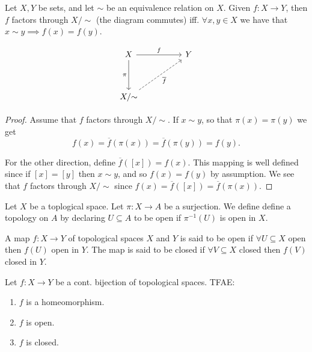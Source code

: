 \begin{proposition}
   Let \( X, Y \) be sets, and let \( \sim \) be an equivalence relation
   on \( X \).
   Given \( f: X \to  Y \), then \( f \) factors through
   \( X / {\sim} \) (the diagram commutes) iff. \( \forall x, y \in X \) we have that
   \( x \sim y \implies f(x) = f(y) \).

\[\begin{tikzcd}
	X && Y \\
	\\
	{X/{\sim}}
	\arrow["f", from=1-1, to=1-3]
	\arrow["\pi"', from=1-1, to=3-1]
	\arrow["{\overline{f}}"', dashed, from=3-1, to=1-3]
\end{tikzcd}\]
\end{proposition}

\begin{proof}
  Assume that \( f \) factors through \( X / {\sim} \).
  If \( x \sim y \), so that \( \pi(x) = \pi(y) \)
  we get
  \[
    f(x) = \overline{f}(\pi(x)) = \overline{f}(\pi(y)) = f(y).
  \]

  For the other direction, define \( \overline{f}([x]) = f(x) \).
  This mapping is well defined since if \( [x] = [y] \) then
  \( x \sim y \), and so \( f(x) = f(y) \) by assumption.
  We see that \( f  \) factors through \( X /{\sim} \) since
  \( f(x) = \overline{f}([x]) = \overline{f}(\pi(x)) \).
\end{proof}

\begin{definition}
   Let \( X \) be a toplogical space.
   Let \( \pi:X \to A \) be a surjection.
   We define define a topology on \( A \) by 
   declaring \( U \subseteq A \) to be open
   if \( {\pi}^{-1} (U) \) is open in \( X \).
\end{definition}

\begin{definition}
   A map \( f:X \to Y  \) of topological spaces \( X \) and \( Y \)
   is said to be open if \( \forall U \subseteq X \) open then \( f(U) \) open in \( Y \). The map is said to be closed if 
\( \forall V \subseteq X \) closed then \( f(V) \) closed in \( Y \).
\end{definition}

\begin{theorem}
    Let \( f:X \to Y \) be a cont. bijection of topological spaces.
    TFAE:
    \begin{enumerate}
      \item \( f \) is a homeomorphism.
      \item \( f \) is open.
      \item \( f \) is closed.
    \end{enumerate}
\end{theorem}

